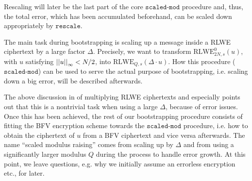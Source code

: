\documentclass[letterpaper,10pt,english]{jupyterBook}
\begin{document}
\sphinxAtStartPar
Rescaling will later be the last part of the core \(\texttt{scaled-mod}\) procedure and, thus, the total error, which has been accumulated beforehand, can be scaled down appropriately by \(\texttt{rescale}\).

\label{\detokenize{Thesis:bootstrapping}}
\begin{DUlineblock}{0em}
\item[] 
\end{DUlineblock}

\begin{DUlineblock}{0em}
\item[] 
\end{DUlineblock}

\sphinxAtStartPar
The main task during bootstrapping is scaling up a message inside a RLWE ciphertext by a large factor \(\Delta\).
Precisely, we want to transform \(\mathrm{RLWE}_{2N,s}^0(u)\), with \(u\) satisfying \(\left\lvert\left\lvert u \right\rvert\right\rvert_\infty < N/2\), into \(\mathrm{RLWE}_{Q,s}(\Delta \cdot u)\).
How this procedure (\(\texttt{scaled-mod}\)) can be used to serve the actual purpose of bootstrapping, i.e. scaling down a big error, will be described afterwards.

\sphinxAtStartPar
The above discussion in {\hyperref[\detokenize{Thesis:preparations-for-bootstrapping}]{}} of multiplying RLWE ciphertexts and especially {\hyperref[\detokenize{Thesis:error-after-rlwe-x-scalar-multiply}]{}} points out that this is a non\sphinxhyphen{}trivial task when using a large \(\Delta\), because of error issues.
Once this has been achieved, the rest of our bootstrapping procedure consists of fitting the BFV encryption scheme towards the \(\texttt{scaled-mod}\) procedure, i.e. how to obtain the ciphertext of \(u\) from a BFV ciphertext and vice versa afterwards.
The name “scaled modulus raising” comes from scaling up by \(\Delta\) and from using a significantly larger modulus \(Q\) during the process to handle error growth.
At this point, we leave questions, e.g. why we initially assume an errorless encryption etc., for later.
\end{document}
